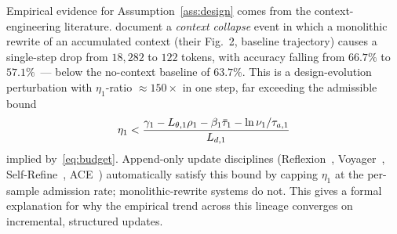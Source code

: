 \documentclass[11pt,a4paper]{article}
\begin{document}
\begin{remark}
\label{rem:context-collapse}
Empirical evidence for Assumption~\ref{ass:design} comes from the
context-engineering literature.  \citet{zhang2025ace} document a
\emph{context collapse} event in which a monolithic rewrite of an
accumulated context (their Fig.~2, baseline trajectory) causes a
single-step drop from $18{,}282$ to $122$ tokens, with accuracy
falling from $66.7\%$ to $57.1\%$~--- below the no-context baseline
of $63.7\%$.  This is a design-evolution perturbation with
$\eta_1$-ratio $\approx 150\times$ in one step, far exceeding the
admissible bound
\begin{equation}
  \eta_1 <
  \frac{\decay_1 - L_{\param,1}\rho_1 - \beta_1\taubar_1
        - \ln\nu_1/\taua[1]}{L_{d,1}}
\end{equation}
implied by~\eqref{eq:budget}.  Append-only update disciplines
(Reflexion~\cite{shinn2023reflexion}, Voyager~\cite{wang2023voyager},
Self-Refine~\cite{madaan2023selfrefine}, ACE~\cite{zhang2025ace})
automatically satisfy this bound by capping $\eta_1$ at the per-sample
admission rate; monolithic-rewrite systems do not.  This gives a
formal explanation for why the empirical trend across this lineage
converges on incremental, structured updates.
\end{remark}
\end{document}
